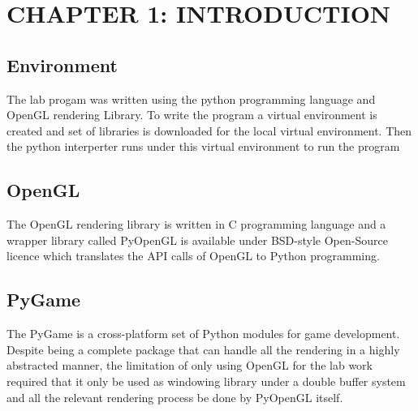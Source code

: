 \documentclass[12pt]{article}
\begin{document}
\clearpage
\thispagestyle{empty}
\tableofcontents

\clearpage
\thispagestyle{empty}
\listoffigures

\clearpage
{}
\section{CHAPTER 1: INTRODUCTION}

\subsection{Environment}
The lab progam was written using the python programming language and OpenGL rendering Library. To write the program a virtual environment is
created and set of libraries is downloaded for the local virtual environment. Then the python interperter runs under this virtual environment
to run the program

\subsection{OpenGL}
The OpenGL rendering library is written in C programming language and a wrapper library called PyOpenGL is available under BSD-style Open-Source licence which translates the
API calls of OpenGL to Python programming.

\subsection{PyGame}
The PyGame is a cross-platform set of Python modules for game development. Despite being a complete package that can handle all the rendering in a highly abstracted manner, the
limitation of only using OpenGL for the lab work required that it only be used as windowing library under a double buffer system and all the relevant rendering process be done by PyOpenGL itself.
\end{document}
